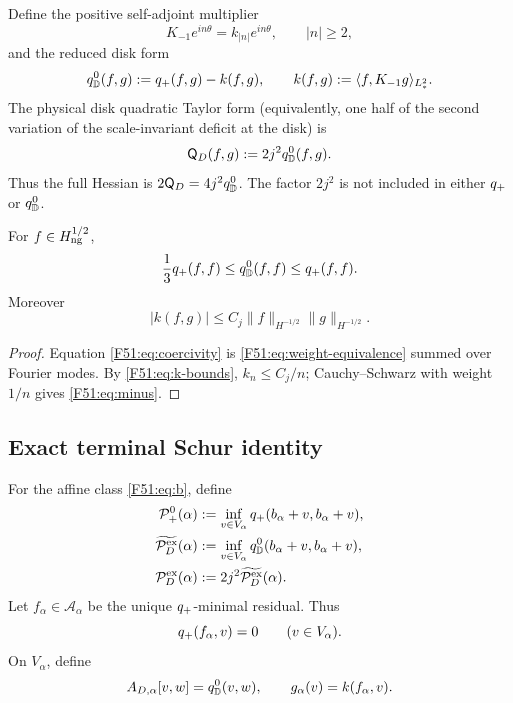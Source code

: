 Define the positive self-adjoint multiplier
\begin{equation}
 K_{-1}e^{in\theta}=k_{|n|}e^{in\theta},
 \qquad |n|\ge2,
\end{equation}
and the reduced disk form
\begin{equation}\label{F51:eq:qD}
 q_{\mathbb D}^{0}(f,g):=q_+(f,g)-k(f,g),
 \qquad
 k(f,g):=\langle f,K_{-1}g\rangle_{L^2_*}.
\end{equation}
The physical disk quadratic Taylor form (equivalently, one half of the
second variation of the scale-invariant deficit at the disk) is
\begin{equation}\label{F51:eq:physical-Q}
 \mathsf Q_D(f,g):=2j^2q_{\mathbb D}^{0}(f,g).
\end{equation}
Thus the full Hessian is $2\mathsf Q_D=4j^2q_{\mathbb D}^{0}$.  The factor $2j^2$ is
not included in either $q_+$ or $q_{\mathbb D}^{0}$.

\begin{corollary}\label{F51:cor:coercivity}
For $f\in H_{\rm ng}^{1/2}$,
\begin{equation}\label{F51:eq:coercivity}
 \frac13q_+(f,f)\le q_{\mathbb D}^{0}(f,f)\le q_+(f,f).
\end{equation}
Moreover
\begin{equation}\label{F51:eq:minus}
 |k(f,g)|\le C_j\|f\|_{H^{-1/2}}\|g\|_{H^{-1/2}}.
\end{equation}
\end{corollary}

\begin{proof}
Equation \eqref{F51:eq:coercivity} is \eqref{F51:eq:weight-equivalence} summed over
Fourier modes.  By \eqref{F51:eq:k-bounds}, $k_n\le C_j/n$; Cauchy--Schwarz with
weight $1/n$ gives \eqref{F51:eq:minus}.
\end{proof}

\subsection{Exact terminal Schur identity}

For the affine class \eqref{F51:eq:b}, define
\begin{align}
 \mathcal P_+^0(\alpha)
 &:=\inf_{v\in V_\alpha}q_+(b_\alpha+v,b_\alpha+v),\label{F51:eq:Pplus}\\
 \widetilde{\mathcal P_D^{\rm ex}}(\alpha)
 &:=\inf_{v\in V_\alpha}q_{\mathbb D}^{0}(b_\alpha+v,b_\alpha+v),\label{F51:eq:PDtilde}\\
 \mathcal P_D^{\rm ex}(\alpha)&:=2j^2\widetilde{\mathcal P_D^{\rm ex}}(\alpha).
 \label{F51:eq:PD}
\end{align}
Let $f_\alpha\in\mathcal A_\alpha$ be the unique $q_+$-minimal
residual.  Thus
\begin{equation}\label{F51:eq:galerkin}
 q_+(f_\alpha,v)=0\qquad(v\in V_\alpha).
\end{equation}
On $V_\alpha$, define
\begin{equation}
 A_{D,\alpha}[v,w]=q_{\mathbb D}^{0}(v,w),
 \qquad g_\alpha(v)=k(f_\alpha,v).
\end{equation}

